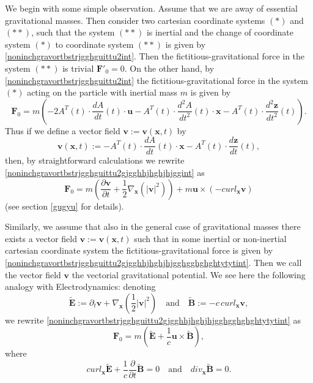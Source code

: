 \documentclass{article}
\theoremstyle{definition}
\theoremstyle{remark}
\renewcommand{\vec}[1]{\mathbf{#1}}
\newcommand{\er}{\eqref}
\newcommand{\er}{\eqref}
\begin{document}
 We begin with some simple observation. Assume that we are away of
essential gravitational masses. Then consider two cartesian
coordinate systems $(*)$ and $(**)$, such that the system $(**)$ is
inertial and the change of coordinate system $(*)$ to coordinate
system $(**)$ is given by \er{noninchgravortbstrjgghguittu2int}.
Then the fictitious-gravitational force in the system $(**)$ is
trivial $\vec F'_0=0$. On the other hand, by
\er{noninchgravortbstrjgghguittu2int} the fictitious-gravitational
force in the system $(*)$ acting on the particle with inertial mass
$m$ is given by
\begin{equation}\label{noninchgravortbstrjgghguittu2gjgghhjhghjhjggint}
\vec F_0=m\left(-2A^T(t)\cdot\frac{dA}{dt}(t)\cdot\vec
u-A^T(t)\cdot\frac{d^2 A}{dt^2}(t)\cdot\vec
x-A^T(t)\cdot\frac{d^2\vec z}{dt^2}(t)\right).
\end{equation}
Thus if we define a vector field $\vec v:=\vec v(\vec x,t)$ by
\begin{equation}\label{noninchgravortbstrjgghguittu2gjgjhjhhklkint}
\vec v(\vec x,t):=-A^T(t)\cdot\frac{dA}{dt}(t)\cdot\vec
x-A^T(t)\cdot\frac{d\vec z}{dt}(t),
\end{equation}
then, by straightforward calculations we rewrite
\er{noninchgravortbstrjgghguittu2gjgghhjhghjhjggint} as
\begin{equation}\label{noninchgravortbstrjgghguittu2gjgghhjhghjhjgghgghghghtytytint}
\vec F_0=m\left(\frac{\partial\vec v}{\partial
t}+\frac{1}{2}\nabla_{\vec x}\left(|\vec v|^2\right)\right)+m\vec
u\times \left(-curl_{\vec x}\vec v\right)
\end{equation}
(see section \ref{gugyu} for details).




 Similarly, we assume that also in the general case of
gravitational masses there exists a vector field $\vec v:=\vec
v(\vec x,t)$ such that in some inertial or non-inertial cartesian
coordinate system the fictitious-gravitational force is given by
\er{noninchgravortbstrjgghguittu2gjgghhjhghjhjgghgghghghtytytint}.
Then we call the vector field $\vec v$ the vectorial gravitational
potential. We see here the following analogy with Electrodynamics:
denoting
\begin{equation*}
\tilde {\vec E}:=\partial_{t}\vec v+\nabla_{\vec
x}\left(\frac{1}{2}|\vec v|^2\right)\quad\text{and}\quad \tilde
{\vec B}:=-c\, curl_{\vec x}\vec v,
\end{equation*}
we rewrite
\er{noninchgravortbstrjgghguittu2gjgghhjhghjhjgghgghghghtytytint} as
\begin{equation*}
\vec F_0=m\left(\tilde {\vec E}+\frac{1}{c}\vec u\times\tilde {\vec
B}\right),
\end{equation*}
where
\begin{equation*}
curl_{\vec x}\tilde {\vec E}+\frac{1}{c}\frac{\partial}{\partial
t}\tilde {\vec B}=0\quad\text{and}\quad div_{\vec x}\tilde {\vec
B}=0.
\end{equation*}
\end{document}
